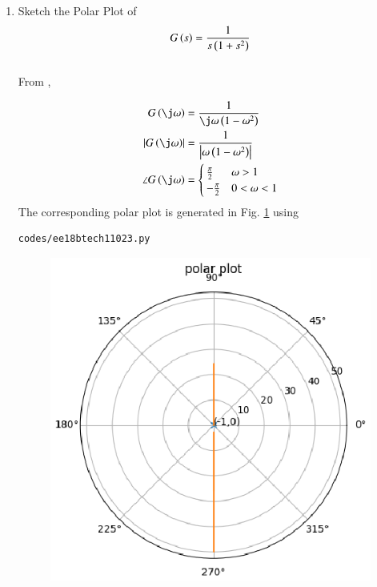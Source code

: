 \begin{enumerate}[label=\thesection.\arabic*.,ref=\thesection.\theenumi]
\item
Sketch the Polar Plot of
\begin{align}
G\left(s\right) = \frac{1}{s\left(1+s^{2}\right)}
\label{eq:ee18btech11023_gain}
\end{align}
\\
\solution  From \label{eq:ee18btech11023_gain},

\begin{align}
G\brak{\j\omega} &=   \frac{1}{\j\omega\brak{1-{\omega}^{2}}}
\\
      \abs{G\brak{\j\omega}} &= \frac{1}{\abs{\omega\brak{1-{\omega}^{2}}}}
\\
    \angle G\brak{\j\omega} &= 
\begin{cases}
\frac{\pi}{2} & \omega > 1
\\
-\frac{\pi}{2} & 0 < \omega < 1
\end{cases}
    \end{align}
%
The corresponding polar plot is generated in Fig.   \ref{fig:ee18btech11023} using 
\begin{lstlisting}
codes/ee18btech11023.py
\end{lstlisting}

\begin{figure}[!ht]
\centering
  \includegraphics[width=\columnwidth]{./figs/ee18btech11023/ee18btech11023_1c.eps}
  \caption{}
  \label{fig:ee18btech11023}
\end{figure}



\end{enumerate}
